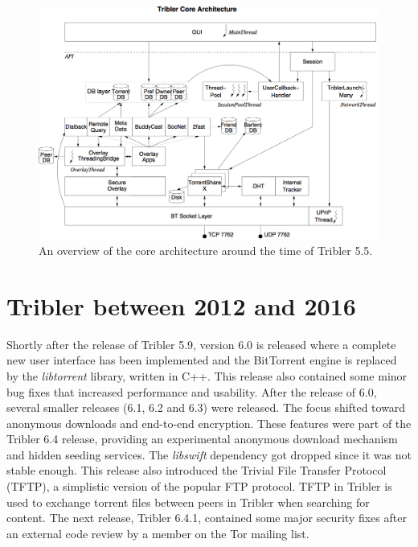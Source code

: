 \begin{figure}[h!]
	\centering
	\includegraphics[width=1.0\columnwidth]{images/architecture/core_architecture_55}
	\caption{An overview of the core architecture around the time of Tribler 5.5.}
	\label{fig:tribler-core-architecture-55}
\end{figure}

\section{Tribler between 2012 and 2016}
Shortly after the release of Tribler 5.9, version 6.0 is released where a complete new user interface has been implemented and the BitTorrent engine is replaced by the \emph{libtorrent} library, written in C++. This release also contained some minor bug fixes that increased performance and usability. After the release of 6.0, several smaller releases (6.1, 6.2 and 6.3) were released. The focus shifted toward anonymous downloads and end-to-end encryption\cite{plak2014anonymous}\cite{tanaskoski2014anonymous}\cite{ruigrok2015bittorrent}. These features were part of the Tribler 6.4 release, providing an experimental anonymous download mechanism and hidden seeding services. The \emph{libswift} dependency got dropped since it was not stable enough. This release also introduced the Trivial File Transfer Protocol (TFTP), a simplistic version of the popular FTP protocol. TFTP in Tribler is used to exchange torrent files between peers in Tribler when searching for content. The next release, Tribler 6.4.1, contained some major security fixes after an external code review by a member on the Tor mailing list\cite{githubissue1066}.

